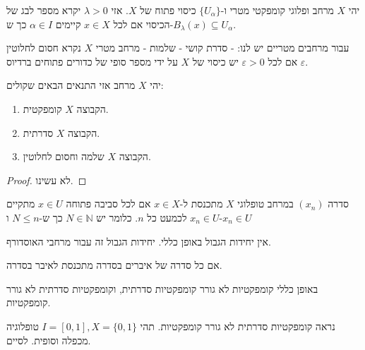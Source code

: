 \documentclass{tstextbook}
\begin{document}
\begin{definition}
יהי \(X\) מרחב ופלוגי קומפקטי מטרי ו-\(\{ U_{\alpha} \}\) כיסוי פתוח של \(X\). אזי \(\lambda> 0\) יקרא מספר לבג של הכיסוי אם לכל \(x \in X\) קיימים \(\alpha \in I\) כך ש-\(B_{\lambda}(x)\subseteq U_{\alpha}\).

\end{definition}
\begin{reminder}
עבור מרחבים מטריים יש לנו:
- סדרת קושי
- שלמות
- מרחב מטרי \(X\) נקרא חסום לחלוטין אם לכל \(\varepsilon> 0\) יש כיסוי של \(X\) על ידי מספר סופי של כדורים פתוחים ברדיוס \(\varepsilon\).

\end{reminder}
\begin{theorem}
יהי \(X\) מרחב אזי התנאים הבאים שקולים:

  \begin{enumerate}
    \item הקבוצה \(X\) קומפקטית. 


    \item הקבוצה \(X\) סדרתית. 


    \item הקבוצה \(X\) שלמה וחסום לחלוטין. 


  \end{enumerate}
\end{theorem}
\begin{proof}
לא עשינו.

\end{proof}
\begin{definition}
סדרה \((x_{n})\) במרחב טופלוגי \(X\) מתכנסת ל-\(x \in X\) אם לכל סביבה פתוחה \(x \in U\) מתקיים \(x_{n}\in U\) לכמעט כל \(n\). כלומר יש \(N \in \mathbb{N}\) כך ש-\(N\leq n\) ו-\(x_{n}\in U\)

\end{definition}
\begin{remark}
אין יחידות הגבול באופן כללי. יחידות הגבול זה עבור מרחבי האוסדורף.

\end{remark}
\begin{definition}
אם כל סדרה של איברים בסדרה מתכנסת לאיבר בסדרה.

\end{definition}
\begin{remark}
באופן כללי קומפקטיות לא גורר קומפקטיות סדרתית, וקומפקטיות סדרתית לא גורר קומפקטיות.

\end{remark}
\begin{example}
נראה קומפקטיות סדרתית לא גורר קומפקטיות. תהי \(I=[0,1],X=\{ 0,1 \}\) טופלוגיה מכפלה וסופית. לסיים.

\end{example}
\end{document}

